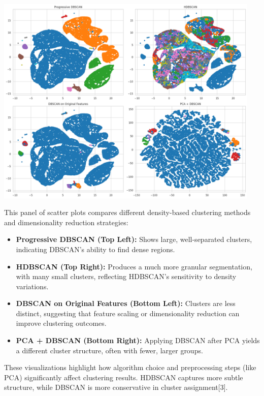 \documentclass[a4paper]{article}
\begin{document}
\begin{multicols}{2}
\noindent
\begin{minipage}{\columnwidth}
\centering
\includegraphics[width=0.95\textwidth]{plots/output.png}
\label{fig:clustering_methods}
\end{minipage}

This panel of scatter plots compares different density-based clustering methods and dimensionality reduction strategies:

\begin{itemize}
    \item \textbf{Progressive DBSCAN (Top Left):} Shows large, well-separated clusters, indicating DBSCAN’s ability to find dense regions.
    \item \textbf{HDBSCAN (Top Right):} Produces a much more granular segmentation, with many small clusters, reflecting HDBSCAN’s sensitivity to density variations.
    \item \textbf{DBSCAN on Original Features (Bottom Left):} Clusters are less distinct, suggesting that feature scaling or dimensionality reduction can improve clustering outcomes.
    \item \textbf{PCA + DBSCAN (Bottom Right):} Applying DBSCAN after PCA yields a different cluster structure, often with fewer, larger groups.
\end{itemize}

These visualizations highlight how algorithm choice and preprocessing steps (like PCA) significantly affect clustering results. HDBSCAN captures more subtle structure, while DBSCAN is more conservative in cluster assignment[3].


\end{multicols}
\end{document}

